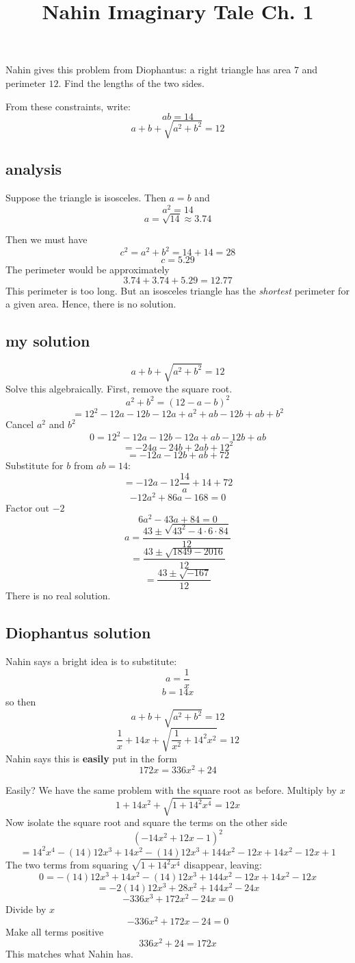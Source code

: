 \documentclass[11pt, oneside]{article}
\title{Nahin Imaginary Tale Ch. 1}
\date{}
\begin{document}
\maketitle
\Large
Nahin gives this problem from Diophantus:  a right triangle has area $7$ and perimeter $12$.  Find the lengths of the two sides.  

From these constraints, write:
\[ ab = 14 \]
\[ a + b + \sqrt{a^2 + b^2} = 12 \]

\subsection*{analysis}
Suppose the triangle is isosceles. Then $a = b$ and
\[ a^2 = 14 \]
\[ a = \sqrt{14} \approx 3.74 \]

Then we must have
\[ c^2 = a^2 + b^2 =  14 + 14 = 28 \]
\[ c = 5.29 \]
The perimeter would be approximately
\[ 3.74 + 3.74 + 5.29 = 12.77 \]
This perimeter is too long.  But an isosceles triangle has the \emph{shortest} perimeter for a given area.  Hence, there is no solution.

\subsection*{my solution}
\[ a + b + \sqrt{a^2 + b^2} = 12 \]
Solve this algebraically.  First, remove the square root.
\[ a^2 + b^2 = (12 - a - b)^2 \]
\[ = 12^2 - 12a -12b -12a + a^2 + ab - 12b + ab + b^2 \]
Cancel $a^2$ and $b^2$
\[ 0 = 12^2 - 12a -12b -12a + ab - 12b + ab \]
\[ = -24a - 24b + 2ab + 12^2 \]
\[ = -12a - 12b + ab + 72 \]
Substitute for $b$ from $ab = 14$:
\[ = -12a - 12 \frac{14}{a} + 14 + 72 \]
\[ -12a^2 + 86a - 168 = 0 \]
Factor out $-2$
\[ 6a^2 - 43a + 84 = 0 \]
\[ a = \frac{43 \pm \sqrt{43^2 - 4 \cdot 6 \cdot 84}}{12} \]
\[ = \frac{43 \pm \sqrt{1849 - 2016}}{12} \]
\[ = \frac{43 \pm \sqrt{-167}}{12}  \]
There is no real solution.

\subsection*{Diophantus solution}
Nahin says a bright idea is to substitute:
\[ a = \frac{1}{x} \]
\[ b = 14x \]
so then
\[ a + b + \sqrt{a^2 + b^2} = 12 \]
\[ \frac{1}{x} + 14x + \sqrt{\frac{1}{x^2} + 14^2 x^2} = 12 \]
Nahin says this is \textbf{easily} put in the form
\[ 172x = 336 x^2 + 24 \]

Easily?  We have the same problem with the square root as before.  Multiply by $x$
\[ 1 + 14x^2 + \sqrt{1 + 14^2 x^4} = 12x \]
Now isolate the square root and square the terms on the other side
\[ (-14x^2 + 12x - 1)^2 \]
\[ = 14^2 x^4 -(14)12x^3 + 14x^2 -(14)12x^3 + 144x^2 - 12x + 14x^2 - 12 x + 1 \]
The two terms from squaring $\sqrt{1 + 14^2 x^4}$ disappear, leaving:
\[ 0 =  -(14)12x^3 + 14x^2 -(14)12x^3 + 144x^2 - 12x + 14x^2 - 12 x  \]
\[ =  -2(14)12x^3 + 28x^2  + 144x^2 - 24x    \]
\[ -336 x^3 + 172x^2 - 24x = 0 \]
Divide by $x$
\[ -336 x^2 + 172x - 24 = 0 \]
Make all terms positive
\[ 336 x^2 + 24 = 172x \]
This matches what Nahin has.
\end{document}
